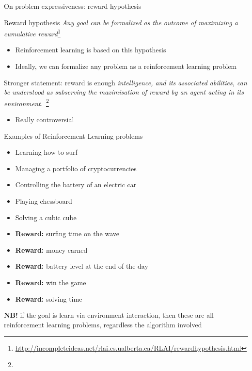 \documentclass[presentation, 9pt]{beamer}\mode<presentation>{\usetheme{AMSBolognaFC}}
\begin{document}
\begin{frame}{On problem expressiveness: reward hypothesis}
\begin{block}{Reward hypothesis}
\emph{Any goal can be formalized as the outcome of maximizing a cumulative reward}\footnote{\url{http://incompleteideas.net/rlai.cs.ualberta.ca/RLAI/rewardhypothesis.html}}
\begin{itemize}
	\item Reinforcement learning is based on this hypothesis
	\item Ideally, we can formalize any problem as a reinforcement learning problem
\end{itemize}
\end{block}

\begin{alertblock}{Stronger statement: reward is enough}
\emph{intelligence, and its associated abilities, can be understood as subserving the maximisation of reward by an agent acting in its environment.}~\footnote{}
\begin{itemize}
	\item Really controversial
\end{itemize}
\end{alertblock}
\end{frame}

\begin{frame}{Examples of Reinforcement Learning problems}
\begin{multicols}{2}
	\begin{itemize}
		\item Learning how to surf
		\item Managing a portfolio of cryptocurrencies
		\item Controlling the battery of an electric car 
		\item Playing chessboard
		\item Solving a cubic cube
	\end{itemize}
	\begin{itemize}
		\item[\faArrowRight] \textbf{Reward:} surfing time on the wave
		\item[\faArrowRight] \textbf{Reward:} money earned
		\item[\faArrowRight] \textbf{Reward:} battery level at the end of the day
		\item[\faArrowRight] \textbf{Reward:} win the game
		\item[\faArrowRight] \textbf{Reward:} solving time 
	\end{itemize}
\end{multicols}
\large
\textbf{NB!} if the goal is learn via environment interaction, then these are all reinforcement learning problems, regardless the algorithm involved
\end{frame}
\end{document}
